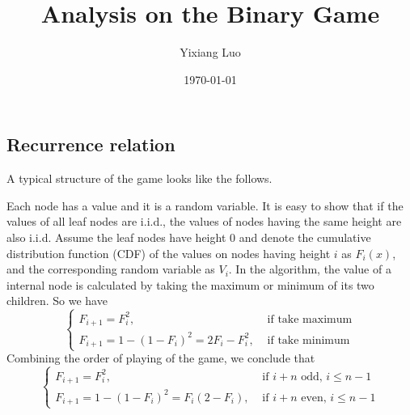 \documentclass{article}
\title{ Analysis on the Binary Game }
\author{Yixiang Luo }
\date{\today}
\begin{document}
\maketitle

\begin{spacing}{1.4}


\section{Recurrence relation}
A typical structure of the game looks like the follows.
\begin{center}
\end{center}

Each node has a value and it is a random variable. It is easy to show that if the values of all leaf nodes are i.i.d., the values of nodes having the same height are also i.i.d. Assume the leaf nodes have height $0$ and denote the cumulative distribution function (CDF) of the values on nodes having height $i$ as $F_i(x)$, and the corresponding random variable as $V_i$. In the algorithm, the value of a internal node is calculated by taking the maximum or minimum of its two children. So we have
\begin{equation}
  \left\{
  \begin{array}{ll}
    F_{i+1} = F_i^2, & \text{ if take maximum}\\
    F_{i+1} = 1 - (1 - F_i)^2 = 2 F_i - F_i^2, & \text{ if take minimum}
  \end{array}\right.
\end{equation}
Combining the order of playing of the game, we conclude that
\begin{equation}
  \left\{
  \begin{array}{ll}
    F_{i+1} = F_i^2, & \text{ if $i+n$ odd, $i \leq n-1$}\\
    F_{i+1} = 1 - (1 - F_i)^2 = F_i (2 - F_i), & \text{ if $i+n$ even, $i \leq n-1$}
  \end{array}\right.
\end{equation}


\end{spacing}
\end{document}
